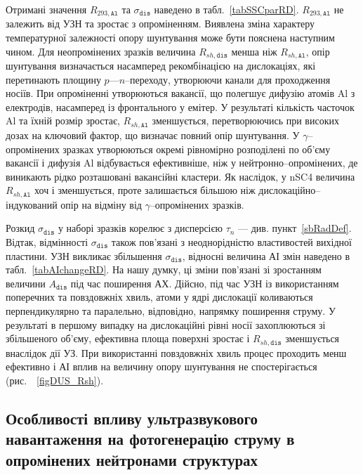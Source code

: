 Отримані значення $R_{293,\mathtt{Al}}$ та $\sigma_{\mathtt{dis}}$ наведено в табл.~\ref{tabSSCparRD}.
$R_{293,\mathtt{Al}}$ не залежить від УЗН та зростає з опроміненням.
Виявлена зміна характеру температурної залежності  опору шунтування може бути пояснена
наступним чином.
Для неопромінених зразків величина $R_{sh,\mathtt{dis}}$ менша ніж $R_{sh,\mathtt{Al}}$,  опір шунтування
визначається насамперед рекомбінацією на дислокаціях, які перетинають площину $p$---$n$--переходу,
утворюючи канали для проходження носіїв.
При опроміненні утворюються вакансії, що полегшує дифузію атомів Al з електродів, насамперед із фронтального у емітер.
У результаті кількість часточок Al та їхній розмір зростає, $R_{sh,\mathtt{Al}}$ зменшується,
перетворюючись при високих дозах на ключовий фактор, що визначає повний  опір шунтування.
У $\gamma$--опромінених зразках утворюються окремі рівномірно розподілені по об'єму вакансії і
дифузія Al відбувається ефективніше, ніж у нейтронно--опромінених, де
виникають рідко розташовані вакансійні кластери.
Як наслідок, у nSC4 величина $R_{sh,\mathtt{Al}}$ хоч і зменшується, проте залишається
більшою ніж дислокаційно--індукований опір на відміну від $\gamma$--опромінених зразків.

Розкид $\sigma_{\mathtt{dis}}$ у наборі зразків корелює з дисперсією $\tau_n$ --- див. пункт~\ref{sbRadDef}.
Відтак, відмінності $\sigma_{\mathtt{dis}}$ також пов'язані з неоднорідністю
властивостей вихідної пластини.
УЗН викликає збільшення $\sigma_{\mathtt{dis}}$, відносні величина АІ змін
наведено в табл.~\ref{tabAIchangeRD}.
На нашу думку, ці зміни пов'язані зі зростанням величини $A_\mathtt{dis}$ під час поширення АХ.
Дійсно, під час УЗН із використанням поперечних та повздовжніх хвиль,
атоми у ядрі дислокації коливаються перпендикулярно та паралельно, відповідно, напрямку поширення струму.
У результаті в першому випадку на дислокаційні рівні носії захоплюються зі збільшеного об'єму,
ефективна площа поверхні зростає і $R_{sh,\mathtt{dis}}$ зменшується внаслідок дії УЗ.
При використанні повздовжніх хвиль процес проходить менш ефективно і АІ вплив на величину
 опору шунтування не спостерігається (рис.~~\ref{figDUS_Rsh}).

\subsection{Особливості впливу ультразвукового навантаження на фотогенерацію струму в опромінених нейтронами структурах\label{sbNIsc}}

